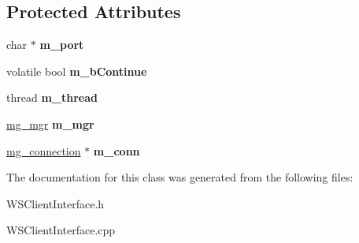 \subsection*{Protected Attributes}
\begin{DoxyCompactItemize}
\item 
\mbox{\label{classTBT_1_1WSClientInterface_a5a2b51f344e17b5f3e9b1f3e861b6efe}} 
char $\ast$ {\bfseries m\+\_\+port}
\item 
\mbox{\label{classTBT_1_1WSClientInterface_a888e4be88a311199a3fa890d3abc6a10}} 
volatile bool {\bfseries m\+\_\+b\+Continue}
\item 
\mbox{\label{classTBT_1_1WSClientInterface_af8db3d6b3e3923b0b61f43cbc2021a92}} 
thread {\bfseries m\+\_\+thread}
\item 
\mbox{\label{classTBT_1_1WSClientInterface_aba2e99d7dcc90848ce6348ee687affbb}} 
\hyperlink{structmg__mgr}{mg\+\_\+mgr} {\bfseries m\+\_\+mgr}
\item 
\mbox{\label{classTBT_1_1WSClientInterface_ae866ad6fbf964a4b6ad1e19895bb24be}} 
\hyperlink{structmg__connection}{mg\+\_\+connection} $\ast$ {\bfseries m\+\_\+conn}
\end{DoxyCompactItemize}


The documentation for this class was generated from the following files\+:\begin{DoxyCompactItemize}
\item 
W\+S\+Client\+Interface.\+h\item 
W\+S\+Client\+Interface.\+cpp\end{DoxyCompactItemize}

